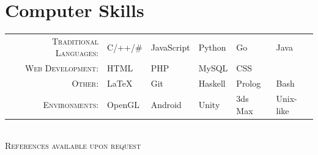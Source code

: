 \documentclass[a4paper,10pt]{article}
\begin{document}
	\section{Computer Skills}
	\def\arraystretch{1.2}%
	\begin{tabu}to \textwidth{r X[c] X[c] X[c] X[c] X[c]}
		\textsc{Traditional Languages:}		&	C/++/\#		&   JavaScript	&	Python	&   Go &	Java	\\
		\textsc{Web Development:}		    &  	HTML	&	PHP		&	MySQL    &  CSS	 & \\
		\textsc{Other:}				        &	LaTeX		&   Git	    &   Haskell &   Prolog   &  Bash	\\
		\textsc{Environments:}		        &	OpenGL		&	Android	&   Unity		&	3ds Max	&	Unix-like	\\
	\end{tabu}
	\\[0.cm]

	\centering\textsc{ References available upon request}
\end{document}
